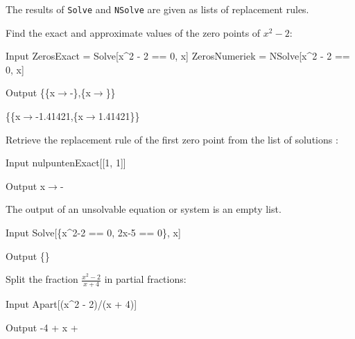The results of \lstinline|Solve| and \lstinline|NSolve| are given as lists of replacement rules.

\begin{example}
Find the exact and approximate values of the zero points of $x^2-2$:
\begin{mdframed}[default, backgroundcolor=gray!40,roundcorner=8pt]

	\begin{mmaCell}[functionlocal={x}]{Input}
		ZerosExact = Solve[x^2 - 2 == 0, x]
		ZerosNumeriek = NSolve[x^2 - 2 == 0, x]
	\end{mmaCell}
	\begin{mmaCell}{Output}
		\{\{x\(\to\)-\},\{x\(\to\)\}\}
		
		\{\{x\(\to\)-1.41421,\{x\(\to\)1.41421\}\}
	\end{mmaCell}
\end{mdframed}
	Retrieve the replacement rule of the first zero point from the list of solutions :
\begin{mdframed}[default,backgroundcolor=gray!40,roundcorner=8pt]
	\begin{mmaCell}[functionlocal={x}]{Input}
		nulpuntenExact[[1, 1]]
	\end{mmaCell}
	\begin{mmaCell}{Output}
		x\(\to\)-
	\end{mmaCell}
\end{mdframed}
	The output of an unsolvable equation or system is an empty list.

\begin{mdframed}[default,backgroundcolor=gray!40,roundcorner=8pt]
	\begin{mmaCell}[functionlocal={x}]{Input}
		Solve[\{x^2-2 == 0, 2x-5 == 0\}, x]
	\end{mmaCell}
	\begin{mmaCell}{Output}
		\{\}
	\end{mmaCell}
\end{mdframed}
Split the fraction $\frac{x^2-2}{x+4}$ in partial fractions:

\begin{mdframed}[default,backgroundcolor=gray!40,roundcorner=8pt]
	\begin{mmaCell}[functionlocal={x}]{Input}
		Apart[(x^2 - 2)/(x + 4)]
	\end{mmaCell}
	\begin{mmaCell}{Output}
		-4 + x + 
	\end{mmaCell}
\end{mdframed}
\end{example}

